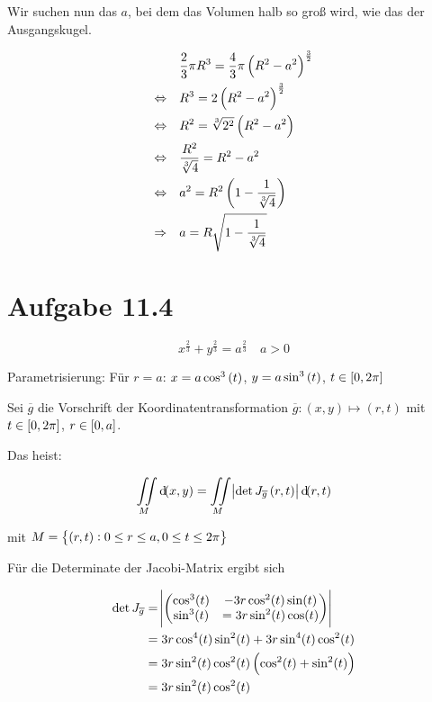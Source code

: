 \documentclass[a4paper,german,12pt,smallheadings]{scrartcl}
\begin{document}
Wir suchen nun das $a$, bei dem das Volumen halb so groß wird, wie das der
Ausgangskugel.

\begin{align*}
  &\frac{2}{3} \pi R^3 = \frac{4}{3}\pi \del{R^2 - a^2}^\frac{3}{2} \\
  \Leftrightarrow \quad&
  R^3 = 2 \del{R^2 - a^2}^\frac{3}{2} \\
  \Leftrightarrow \quad&
  R^2 = \sqrt[3]{2^2} \del{R^2 - a^2} \\
  \Leftrightarrow \quad&
  \frac{R^2}{\sqrt[3]{4}} = {R^2 - a^2} \\
  \Leftrightarrow \quad&
  a^2 = R^2 \del{1 - \frac{1}{\sqrt[3]{4}}} \\
  \Rightarrow \quad&
  a = R \sqrt{1 - \frac{1}{\sqrt[3]{4}}} \\
\end{align*}

\section*{Aufgabe 11.4}

\begin{equation*}
  x^\frac{2}{3} + y^\frac{2}{3} = a^\frac{2}{3} \quad a > 0
\end{equation*}

Parametrisierung: Für $r=a$: $x = a \cos^3\del{t}$, $y = a \sin^3\del{t}$, $t \in \sbr{0, 2 \pi}$

Sei $\overline{g}$ die Vorschrift der Koordinatentransformation $\overline{g}:
(x,y) \mapsto (r,t)$ mit $t \in \sbr{0, 2\pi}$, $r \in \sbr{0, a}$.

Das heist:

\begin{equation*}
  \iint\limits_{M} \dif(x,y) = \iint\limits_{M} \envert{\det J_{\overline{g}}\del{r,t}} \dif(r,t)
\end{equation*}

mit $M = \cbr{(r,t): 0 \le r \le a, 0 \le t \le 2 \pi}$

Für die Determinate der Jacobi-Matrix ergibt sich

\begin{align*}
  \det J_{\overline{g}} &=
  \envert{\begin{pmatrix}
    \cos^3(t) &- 3r \cos^2(t)\sin(t) \\
    \sin^3(t) &= 3r \sin^2(t)\cos(t)
  \end{pmatrix}} \\
  &= 3r \cos^4(t) \sin^2(t) + 3 r \sin^4(t) \cos^2(t) \\
  &= 3r \sin^2(t) \cos^2(t) \del{\cos^2(t) + \sin^2(t)} \\
  &= 3r \sin^2(t) \cos^2(t)
\end{align*}
\end{document}
